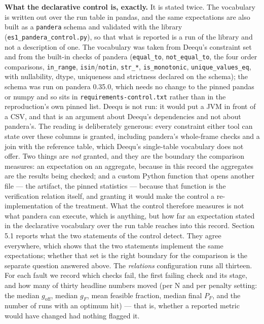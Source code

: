 \documentclass[acmsmall,screen,review]{acmart}
\begin{document}
\textbf{What the declarative control is, exactly.} It is stated twice. The vocabulary is written out over the run table in pandas, and the same expectations are also built as a \texttt{pandera} schema and validated with the library (\texttt{es1\_\allowbreak{}pandera\_\allowbreak{}control.\allowbreak{}py}), so that what is reported is a run of the library and not a description of one. The vocabulary was taken from Deequ's constraint set \cite{ref16} and from the built-in checks of pandera \cite{ref17} (\texttt{equal\_to}, \texttt{not\_equal\_to}, the four order comparisons, \texttt{in\_range}, \texttt{isin}/\texttt{notin}, \texttt{str\_*}, \texttt{is\_monotonic}, \texttt{unique\_\allowbreak{}values\_\allowbreak{}eq}, with nullability, dtype, uniqueness and strictness declared on the schema); the schema was run on pandera 0.35.0, which needs no change to the pinned pandas or numpy and so sits in \texttt{requirements-\allowbreak{}control.\allowbreak{}txt} rather than in the reproduction's own pinned list. Deequ is not run: it would put a JVM in front of a CSV, and that is an argument about Deequ's dependencies and not about pandera's. The reading is deliberately generous: every constraint either tool can state over these columns is granted, including pandera's whole-frame checks and a join with the reference table, which Deequ's single-table vocabulary does not offer. Two things are \textit{not} granted, and they are the boundary the comparison measures: an expectation on an aggregate, because in this record the aggregates are the results being checked; and a custom Python function that opens another file --- the artifact, the pinned statistics --- because that function is the verification relation itself, and granting it would make the control a re-implementation of the treatment. What the control therefore measures is not what pandera can execute, which is anything, but how far an expectation stated in the declarative vocabulary over the run table reaches into this record. Section 5.1 reports what the two statements of the control detect. They agree everywhere, which shows that the two statements implement the same expectations; whether that set is the right boundary for the comparison is the separate question answered above. The \textit{relations} configuration runs all thirteen. For each fault we record which checks fail, the first failing check and its stage, and how many of thirty headline numbers moved (per N and per penalty setting: the median $g_{\mathrm{off}}$, median $g_{F}$, mean feasible fraction, median final $P_{F}$, and the number of runs with an optimum hit) --- that is, whether a reported metric would have changed had nothing flagged it.
\end{document}
